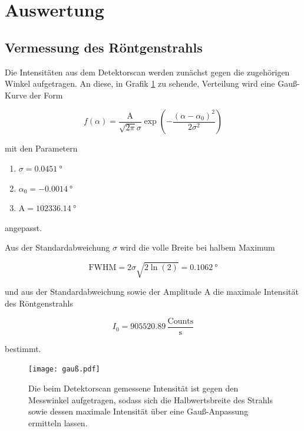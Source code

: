 \newpage
\section{Auswertung}
  \subsection{Vermessung des Röntgenstrahls}
    Die Intensitäten aus dem Detektorscan werden zunächst gegen die zugehörigen Winkel aufgetragen. An diese, in Grafik \ref{fig:gauß} zu sehende, Verteilung wird eine Gauß-Kurve der Form

    \begin{equation*}
      f(\alpha) = \frac{\text{A}}{\sqrt{2\pi}\sigma} \exp\left(-\frac{\left(\alpha - \alpha_0\right)^2}{2\sigma^2}\right)
    \end{equation*}
            
    mit den Parametern

    \begin{enumerate}
      \item $\sigma = \SI{0.0451}{\degree}$
      \item $\alpha_0 = \SI{-0.0014}{\degree}$
      \item $\text{A} = \SI{102336.14}{\degree}$
    \end{enumerate}

    angepasst.

    Aus der Standardabweichung $\sigma$ wird die volle Breite bei halbem Maximum

    \begin{equation*}
      \text{FWHM} = 2\sigma\sqrt{2\ln(2)} = \SI{0.1062}{\degree}
    \end{equation*}

    und aus der Standardabweichung sowie der Amplitude A die maximale Intensität des Röntgenstrahls

    \begin{equation*}
      I_0 = \si{905520.89}\,\frac{\text{Counts}}{\text{s}}
    \end{equation*}

    bestimmt.

    \FloatBarrier
    \begin{figure}[h]
        \centering
        \texttt{[image: gauß.pdf]}
        \caption{Die beim Detektorscan gemessene Intensität ist gegen den Messwinkel aufgetragen, sodass sich die Halbwertsbreite des Strahls sowie dessen maximale Intensität über eine Gauß-Anpassung ermitteln lassen.}
        \label{fig:gauß}
      \end{figure}
  

